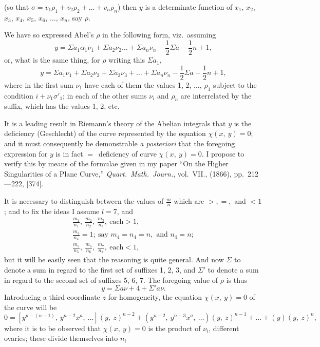 \documentclass[11pt,a4paper]{book}
\begin{document}

\newpage
(so that $\sigma=v_1\rho_1+v_2\rho_2+\dots+v_n\rho_n$) then $y$ is a determinate function of $x_1$, $x_2$, $x_3$, $x_4$, $x_5$, $x_6$, $\dots$, $x_n$, say $\rho$.

We have so expressed Abel's $\rho$ in the following form, viz.\ assuming
\[
y=\Sigma a_1 \alpha_1 \nu_1+\Sigma a_2\nu_2\dots+\Sigma a_n\nu_n-\frac{1}{2}\Sigma a-\frac{1}{2}n+1,
\]
or, what is the same thing, for $\rho$ writing this $\Sigma a_1$,
\[
y=\Sigma a_1\nu_1+\Sigma a_2\nu_2+\Sigma a_3\nu_3+\dots+\Sigma a_n\nu_n-\frac{1}{2}\Sigma a-\frac{1}{2}n+1,
\]
where in the first sum $\nu_1$ have each of them the values 1, 2, $\dots$, $\rho_1$ subject to the condition $i+\nu_1\sigma'_1$; in each of the other sums $\nu_i$ and $\rho_n$ are interrelated by the suffix, which has the values 1, 2, etc.

It is a leading result in Riemann's theory of the Abelian integrals that $y$ is the deficiency (Geschlecht) of the curve represented by the equation $\chi(x,\ y)=0$; and it must consequently be demonstrable \textit{a posteriori} that the foregoing expression for $y$ is in fact $=$~deficiency of curve $\chi(x,\ y)=0$. I propose to verify this by means of the formulae given in my paper ``On the Higher Singularities of a Plane Curve,'' \textit{Quart.\ Math.\ Journ.}, vol.~VII., (1866), pp.~212---222, [374].

It is necessary to distinguish between the values of $\frac{m}{n}$ which are $>,=,$ and $<1$; and to fix the ideas I assume $l=7$, and
\begin{gather*}
\frac{m_1}{n_1},\ \frac{m_2}{n_2},\ \frac{m_3}{n_3},\ \text{each}>1,\\
\frac{m_4}{n_4}=1;\ \text{say } m_4=n_4=n,\text{ and } n_4=n;\\
\frac{m_5}{n_5},\ \frac{m_6}{n_6},\ \frac{m_7}{n_7},\ \text{each}<1,
\end{gather*}
but it will be easily seen that the reasoning is quite general. And now $\Sigma$ to denote a sum in regard to the first set of suffixes 1, 2, 3, and $\Sigma'$ to denote a sum in regard to the second set of suffixes 5, 6, 7. The foregoing value of $\rho$ is thus
\[
y=\Sigma a\nu+4+\Sigma'a\nu.
\]
Introducing a third coordinate $z$ for homogeneity, the equation $\chi(x,\ y)=0$ of the curve will be
\[
0=\left[y^{p-(n-1)},\ y^{n-2}x^a,\ \dots\right]\left(y,\ z\right)^{n-2}+\left(y^{n-2},\ y^{n-3}x^a,\ \dots\right)\left(y,\ z\right)^{n-1}+\dots+\left(y\right)\left(y,\ z\right)^n,
\]
where it is to be observed that $\chi(x,\ y)=0$ is the product of $\nu_i$, different ovaries; these divide themselves into $n_i$
\end{document}
